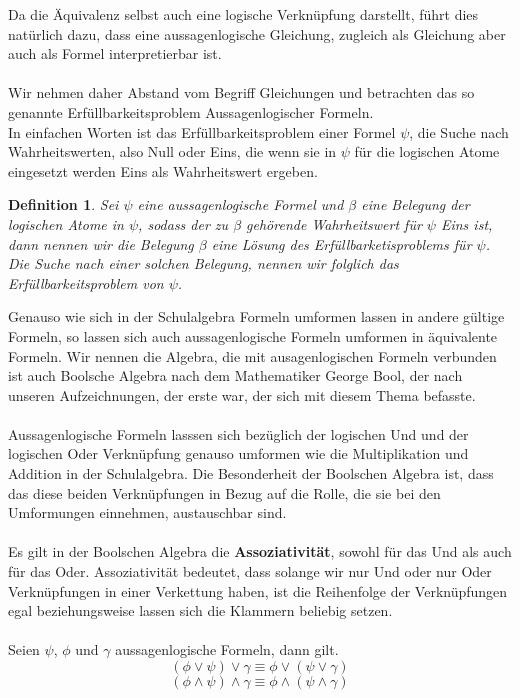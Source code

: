 \documentclass[11pt,a4paper,leqno]{report}
\newtheorem{definition}[theorem]{Definition}
\numberwithin{equation}{chapter}
\begin{document}
Da die Äquivalenz selbst auch eine logische Verknüpfung darstellt, führt dies natürlich dazu, dass eine aussagenlogische Gleichung, zugleich als Gleichung aber auch als Formel interpretierbar ist.\\
\\
Wir nehmen daher Abstand vom Begriff Gleichungen und betrachten das so genannte Erfüllbarkeitsproblem Aussagenlogischer Formeln.\\
In einfachen Worten ist das Erfüllbarkeitsproblem einer Formel $\psi$, die Suche nach Wahrheitswerten, also Null oder Eins, die wenn sie in $\psi$ für die logischen Atome eingesetzt werden Eins als Wahrheitswert ergeben.
\begin{definition}
	Sei $\psi$ eine aussagenlogische Formel und $\beta$ eine Belegung der logischen Atome in $\psi$, sodass der zu $\beta$ gehörende Wahrheitswert für $\psi$ Eins ist, dann nennen wir die Belegung $\beta$ eine Lösung des Erfüllbarketisproblems für $\psi$. Die Suche nach einer solchen Belegung, nennen wir folglich das Erfüllbarkeitsproblem von $\psi$.
\end{definition}
Genauso wie sich in der Schulalgebra Formeln umformen lassen in andere gültige Formeln, so lassen sich auch aussagenlogische Formeln umformen in äquivalente Formeln. Wir nennen die Algebra, die mit ausagenlogischen Formeln verbunden ist auch Boolsche Algebra nach dem Mathematiker George Bool, der nach unseren Aufzeichnungen, der erste war, der sich mit diesem Thema befasste.\\
\\
Aussagenlogische Formeln lasssen sich bezüglich der logischen Und und der logischen Oder Verknüpfung genauso umformen wie die Multiplikation und Addition in der Schulalgebra. Die Besonderheit der Boolschen Algebra ist, dass das diese beiden Verknüpfungen in Bezug auf die Rolle, die sie bei den Umformungen einnehmen, austauschbar sind.\\
\\
Es gilt in der Boolschen Algebra die \textbf{Assoziativität}, sowohl für das Und als auch für das Oder. Assoziativität bedeutet, dass solange wir nur Und oder nur Oder Verknüpfungen in einer Verkettung haben, ist die Reihenfolge der Verknüpfungen egal beziehungsweise lassen sich die Klammern beliebig setzen.\\
\\
Seien $\psi$, $\phi$ und $\gamma$ aussagenlogische Formeln, dann gilt.
\begin{equation}
	(\phi \vee \psi)\vee\gamma \equiv \phi \vee (\psi\vee\gamma)
\end{equation}
\begin{equation}
	(\phi \wedge \psi)\wedge\gamma \equiv \phi \wedge (\psi\wedge\gamma)
\end{equation}
\end{document}
